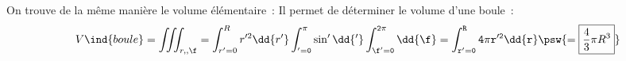 \documentclass[../../main/main.tex]{subfiles}
\begin{document}
On trouve de la même manière le volume élémentaire~:
\psw{
	\[
		\boxed{\dd{V} = r^{2}\sin(\theta)\dd{r}\dd{\tt}\dd{\f}}
	\]
}
Il permet de déterminer le volume d'une boule~:
\[
	V\ind{boule}
	= \iiint_{r,\tt,\f}
	= \int_{r'=0}^{R} r'^2\dd{r'}
	\int_{\tt' = 0}^{\pi} \sin\tt'\dd{\tt'}
	\int_{\f'=0}^{2\pi} \dd{\f}
	= \int_{r'=0}^{R} 4\pi r'^2 \dd{r}
	\psw{
		= \boxed{\frac{4}{3}\pi R^3}
	}
\]
\end{document}
